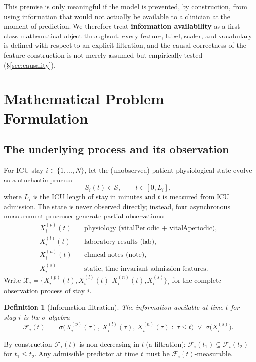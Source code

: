 \documentclass[11pt]{article}
\newtheorem{definition}{Definition}[section]
\newcommand{\F}{\mathcal{F}}
\newcommand{\X}{\mathcal{X}}
\newcommand{\1}[1]{\mathbf{1}\!\left[#1\right]}
\newcommand{\Sig}{\sigma}
\begin{document}
This premise is only meaningful if the model is prevented, by construction, from using information that would not actually be available to a clinician at the moment of prediction. We therefore treat \textbf{information availability} as a first-class mathematical object throughout: every feature, label, scaler, and vocabulary is defined with respect to an explicit filtration, and the causal correctness of the feature construction is not merely assumed but empirically tested (\S\ref{sec:causality}).

\section{Mathematical Problem Formulation}

\subsection{The underlying process and its observation}

For ICU stay $i \in \{1,\dots,N\}$, let the (unobserved) patient physiological state evolve as a stochastic process
\[
S_i(t) \in \mathcal{S}, \qquad t \in [0, L_i],
\]
where $L_i$ is the ICU length of stay in minutes and $t$ is measured from ICU admission. The state is never observed directly; instead, four asynchronous measurement processes generate partial observations:
\begin{align}
X_i^{(p)}(t) &\quad \text{physiology (vitalPeriodic + vitalAperiodic)}, \\
X_i^{(l)}(t) &\quad \text{laboratory results (lab)}, \\
X_i^{(n)}(t) &\quad \text{clinical notes (note)}, \\
X_i^{(s)} &\quad \text{static, time-invariant admission features.}
\end{align}
Write $\X_i = \{X_i^{(p)}(t), X_i^{(l)}(t), X_i^{(n)}(t), X_i^{(s)}\}_{t}$ for the complete observation process of stay $i$.

\begin{definition}[Information filtration]
The \emph{information available at time $t$} for stay $i$ is the $\sigma$-algebra
\[
\F_i(t) \;=\; \Sig\Big( X_i^{(p)}(\tau),\, X_i^{(l)}(\tau),\, X_i^{(n)}(\tau) \;:\; \tau \le t \Big) \;\vee\; \Sig\big(X_i^{(s)}\big).
\]
\end{definition}
By construction $\F_i(t)$ is non-decreasing in $t$ (a filtration): $\F_i(t_1)\subseteq \F_i(t_2)$ for $t_1\le t_2$. Any admissible predictor at time $t$ must be $\F_i(t)$-measurable.
\end{document}
